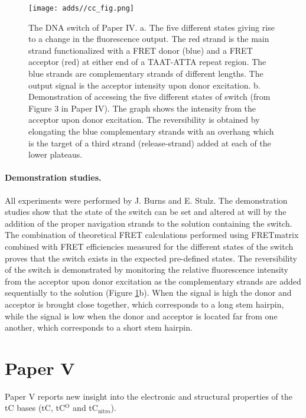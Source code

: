 \begin{figure}
    \centering
        \texttt{[image: adds//cc\_fig.png]}
    \captionsetup{width=.95\textwidth}
    \caption{The DNA switch of Paper IV. a. The five different states giving rise to a change in the fluorescence output. The red strand is the main strand functionalized with a FRET donor (blue) and a FRET acceptor (red) at either end of a TAAT-ATTA repeat region. The blue strands are complementary strands of different lengths. The output signal is the acceptor intensity upon donor excitation. b. Demonstration of accessing the five different states of switch (from Figure 3 in Paper IV). The graph shows the intensity from the acceptor upon donor excitation. The reversibility is obtained by elongating the blue complementary strands with an overhang which is the target of a third strand (release-strand) added at each of the lower plateaus.}
    \label{Fig:chap_Papers_CC}
\end{figure}

 \paragraph{Demonstration studies.} All experiments were performed by J. Burns and E. Stulz. The demonstration studies show that the state of the switch can be set and altered at will by the addition of the proper navigation strands to the solution containing the switch. The combination of theoretical FRET calculations performed using FRETmatrix combined with FRET efficiencies measured for the different states of the switch proves that the switch exists in the expected pre-defined states. The reversibility of the switch is demonstrated by monitoring the relative fluorescence intensity from the acceptor upon donor excitation as the complementary strands are added sequentially to the solution (Figure \ref{Fig:chap_Papers_CC}b). When the signal is high the donor and acceptor is brought close together, which corresponds to a long stem hairpin, while the signal is low when the donor and acceptor is located far from one another, which corresponds to a short stem hairpin.

\section{Paper V}
 Paper V reports new insight into the electronic and structural properties of the tC bases (tC, tC$^\mathrm{O}$ and tC$_\mathrm{nitro}$).

